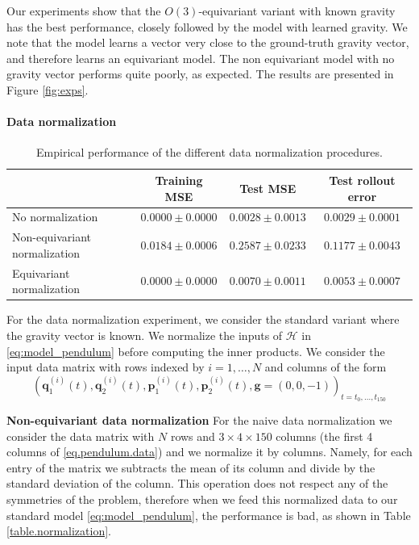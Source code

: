 \documentclass[accepted]{article}
\renewcommand{\mathcal}[1]{\mathscr{#1}} %
\begin{document}
Our experiments show that the $O(3)$-equivariant variant with known gravity has the best performance, closely followed by the model with learned gravity. We note that the model learns a vector very close to the ground-truth gravity vector, and therefore learns an equivariant model. The non equivariant model with no gravity vector performs quite poorly, as expected. The results are presented in Figure \ref{fig:exps}.

\paragraph{Data normalization} 
\begin{table}[t!]
    \centering
    \begin{tabular}{lccc}
         \toprule
            & Training MSE & Test MSE  & Test rollout error\\
         \midrule
         No normalization  & $0.0000\pm0.0000$    & $0.0028\pm 0.0013$  & $0.0029\pm 0.0001$\\
         Non-equivariant normalization & $0.0184\pm 0.0006$ & $0.2587\pm 0.0233$ & $0.1177\pm 0.0043$\\
         Equivariant normalization & $0.0000\pm0.0000$ & $0.0070\pm 0.0011$ & $0.0053\pm 0.0007$\\
         \bottomrule
    \end{tabular}
    \caption{Empirical performance of the different data normalization procedures. \label{table.normalization}}
    \label{tbl:double_pendulumn}
\end{table} 
For the data normalization experiment, we consider the standard variant where the gravity vector is known. We normalize the inputs of $\mathcal H$ in \eqref{eq:model_pendulum} before computing the inner products. 
We consider the input data matrix with rows indexed by $i=1,\ldots, N$ and columns of the form  
\begin{equation}(\mathbf q_1^{(i)}(t), \mathbf q_2^{(i)}(t), \mathbf p_1^{(i)}(t), \mathbf p_2^{(i)}(t), \mathbf g=(0,0,-1))_{t=t_0, \ldots, t_{150}} \label{eq.pendulum.data}
\end{equation}

\textbf{Non-equivariant data normalization}
For the naive data normalization we consider the data matrix with $N$ rows and $3\times 4\times 150$ columns (the first 4 columns of \eqref{eq.pendulum.data}) and we normalize it by columns. Namely, for each entry of the matrix we subtracts the mean of its column and divide by the standard deviation of the column. This operation does not respect any of the symmetries of the problem, therefore when we feed this normalized data to our standard model \eqref{eq:model_pendulum}, the performance is bad, as shown in Table \ref{table.normalization}.
\end{document}
